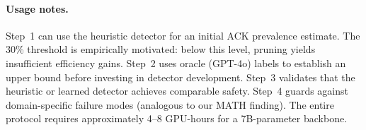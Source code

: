 \paragraph{Usage notes.}
Step~1 can use the heuristic detector for an initial ACK prevalence estimate. The 30\% threshold is empirically motivated: below this level, pruning yields insufficient efficiency gains. Step~2 uses oracle (GPT-4o) labels to establish an upper bound before investing in detector development. Step~3 validates that the heuristic or learned detector achieves comparable safety. Step~4 guards against domain-specific failure modes (analogous to our MATH finding). The entire protocol requires approximately 4--8 GPU-hours for a 7B-parameter backbone.

